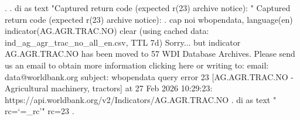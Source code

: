 . 
. di as text "Captured return code (expected r(23) archive notice): "
Captured return code (expected r(23) archive notice): 
{\smallskip}
. cap noi wbopendata, language(en) indicator(AG.AGR.TRAC.NO) clear
(using cached data: ind_ag_agr_trac_no_all_en.csv, TTL 7d)
{\smallskip}
    Sorry... but indicator AG.AGR.TRAC.NO has been moved to 57 WDI Database
    Archives.
{\smallskip}
    Please send us an email to obtain more information clicking here or
    writing to:
            email: data@worldbank.org
            subject: wbopendata query error 23 [AG.AGR.TRAC.NO - Agricultural
    machinery, tractors] at 27 Feb 2026 10:29:23:
    https://api.worldbank.org/v2/Indicators/AG.AGR.TRAC.NO
{\smallskip}
{\smallskip}
{\smallskip}
. di as text "  rc=`=_rc'"
  rc=23
{\smallskip}
. 
